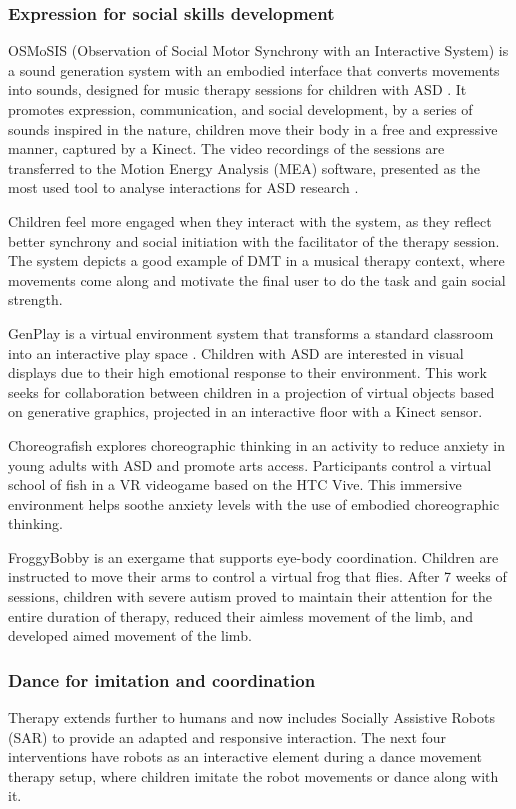 \documentclass[a4paper,fleqn]{cas-sc}
\begin{document}
\subsubsection{Expression for social skills development} 

OSMoSIS (Observation of Social Motor Synchrony with an Interactive System) is a sound generation system with an embodied interface that converts movements into sounds, designed for music therapy sessions for children with ASD \cite{Ragone20, Osmosis20}. It promotes expression, communication, and social development, by a series of sounds inspired in the nature, children move their body in a free and expressive manner, captured by a Kinect. The video recordings of the sessions are transferred to the Motion Energy Analysis (MEA) software, presented as the most used tool to analyse interactions for ASD research \cite{Ragone22}.

Children feel more engaged when they interact with the system, as they reflect better synchrony and social initiation with the facilitator of the therapy session. The system depicts a good example of DMT in a musical therapy context, where movements come along and motivate the final user to do the task and gain social strength.

GenPlay is a virtual environment system that transforms a standard classroom into an interactive play space \cite{Crowell18}. Children with ASD are interested in visual displays due to their high emotional response to their environment. This work seeks for collaboration between children in a projection of virtual objects based on generative graphics, projected in an interactive floor with a Kinect sensor.

Choreografish explores choreographic thinking in an activity to reduce anxiety in young adults with ASD \cite{AltizerJr18} and promote arts access. Participants control a virtual school of fish in a VR videogame based on the HTC Vive. This immersive environment helps soothe anxiety levels with the use of embodied choreographic thinking.

FroggyBobby is an exergame that supports eye-body coordination\cite{Caro17}. Children are instructed to move their arms to control a virtual frog that flies. After 7 weeks of sessions, children with severe autism proved to maintain their attention for the entire duration of therapy, reduced their aimless movement of the limb, and developed aimed movement of the limb.


\subsubsection{Dance for imitation and coordination}  %
Therapy extends further to humans and now includes Socially Assistive Robots (SAR) to provide an adapted and responsive interaction. The next four interventions have robots as an interactive element during a dance movement therapy setup, where children imitate the robot movements or dance along with it.
\end{document}
